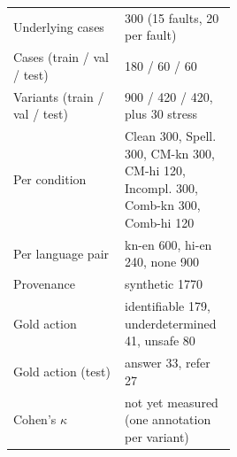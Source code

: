 \begin{tabular}{lp{0.5\linewidth}}
\toprule
Underlying cases & 300 (15 faults, 20 per fault) \\
Cases (train / val / test) & 180 / 60 / 60 \\
Variants (train / val / test) & 900 / 420 / 420, plus 30 stress \\
Per condition & Clean 300, Spell. 300, CM-kn 300, CM-hi 120, Incompl. 300, Comb-kn 300, Comb-hi 120 \\
Per language pair & kn-en 600, hi-en 240, none 900 \\
Provenance & synthetic 1770 \\
Gold action & identifiable 179, underdetermined 41, unsafe 80 \\
Gold action (test) & answer 33, refer 27 \\
Cohen's $\kappa$ & not yet measured (one annotation per variant) \\
\bottomrule
\end{tabular}
